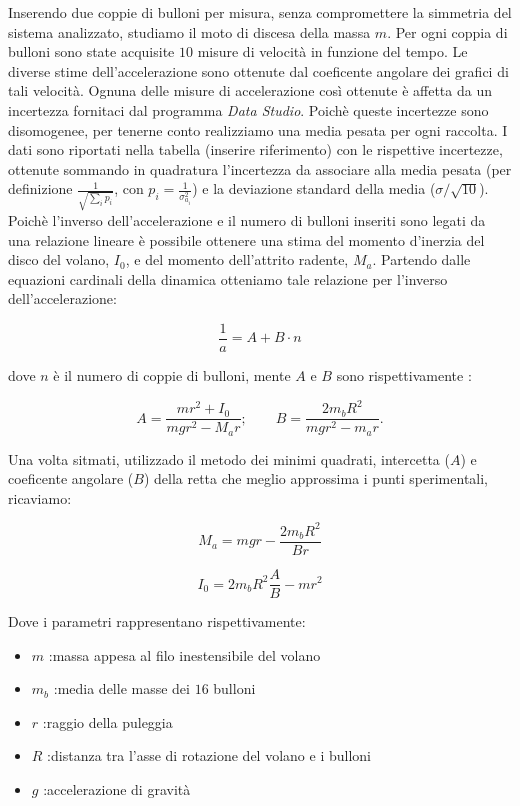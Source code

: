 \documentclass[10pt,oneside,a4paper]{article}
\begin{document}
Inserendo due coppie di bulloni per misura, senza compromettere la simmetria del sistema analizzato, studiamo il moto di discesa della massa $m$. Per ogni coppia di bulloni sono state acquisite $10$ misure di velocità in funzione del tempo. Le diverse stime dell'accelerazione sono ottenute dal coeficente angolare dei grafici di tali velocità. Ognuna delle misure di accelerazione così ottenute è affetta da un incertezza fornitaci dal programma \emph{Data Studio}. Poichè queste incertezze sono disomogenee, per tenerne conto realizziamo una media pesata per ogni raccolta. I dati sono riportati nella tabella (inserire riferimento) con le rispettive incertezze, ottenute sommando in quadratura l'incertezza da associare alla media pesata (per definizione $\frac{1}{\sqrt{\sum_{i}p_i}}$, con $p_i = \frac{1}{\sigma_{a_i}^2}$) e la deviazione standard della media ($\sigma/\sqrt{10}$).
Poichè l'inverso dell'accelerazione e il numero di bulloni inseriti sono legati da una relazione lineare è possibile ottenere una stima del momento d'inerzia del disco del volano, $I_0$, e del momento dell'attrito radente, $M_a$. Partendo dalle equazioni cardinali della dinamica otteniamo tale relazione per l'inverso dell'accelerazione: 
	
	\begin{equation}\label{eq:equazioneretta}
	\frac{1}{a}= A + B\cdot n
	\end{equation}
	
dove $n$ è il numero di coppie di bulloni, mente \emph{$A$} e \emph{$B$} sono rispettivamente :
	
	\begin{equation}\label{eq:intercettaecoefficente}
	A = \frac{mr^2+I_0}{mgr^2-M_a r}; \qquad B = \frac{2m_b R^2}{mgr^2-m_a r}.
	\end{equation}

Una volta sitmati, utilizzado il metodo dei minimi quadrati, intercetta ($A$) e coeficente angolare ($B$) della retta che meglio approssima i punti sperimentali, ricaviamo:

\begin{equation}\label{eq:momentoattrito}
M_a = mgr - \frac{2m_b R^2}{Br}
\end{equation}

\begin{equation}\label{eq:momentoinerzia}
I_0 = 2m_bR^2 \frac{A}{B} - mr^2
\end{equation}

Dove i parametri rappresentano rispettivamente:
\begin{itemize}
	\item $m$ :massa appesa al filo inestensibile del volano 
	\item $m_b$ :media delle masse dei $16$ bulloni 
	\item $r$ :raggio della puleggia 
	\item $R$ :distanza tra l'asse di rotazione del volano e i bulloni 
	\item $g$ :accelerazione di gravità 
\end{itemize}
\end{document}
